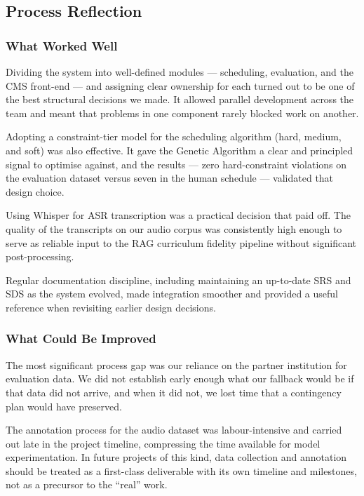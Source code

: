 \subsection{Process Reflection}

\subsubsection{What Worked Well}

Dividing the system into well-defined modules --- scheduling, evaluation, and the CMS front-end --- and assigning clear ownership for each turned out to be one of the best structural decisions we made. It allowed parallel development across the team and meant that problems in one component rarely blocked work on another.

Adopting a constraint-tier model for the scheduling algorithm (hard, medium, and soft) was also effective. It gave the Genetic Algorithm a clear and principled signal to optimise against, and the results --- zero hard-constraint violations on the evaluation dataset versus seven in the human schedule --- validated that design choice.

Using Whisper for ASR transcription was a practical decision that paid off. The quality of the transcripts on our audio corpus was consistently high enough to serve as reliable input to the RAG curriculum fidelity pipeline without significant post-processing.

Regular documentation discipline, including maintaining an up-to-date SRS and SDS as the system evolved, made integration smoother and provided a useful reference when revisiting earlier design decisions.

\subsubsection{What Could Be Improved}

The most significant process gap was our reliance on the partner institution for evaluation data. We did not establish early enough what our fallback would be if that data did not arrive, and when it did not, we lost time that a contingency plan would have preserved.

The annotation process for the audio dataset was labour-intensive and carried out late in the project timeline, compressing the time available for model experimentation. In future projects of this kind, data collection and annotation should be treated as a first-class deliverable with its own timeline and milestones, not as a precursor to the ``real'' work.

